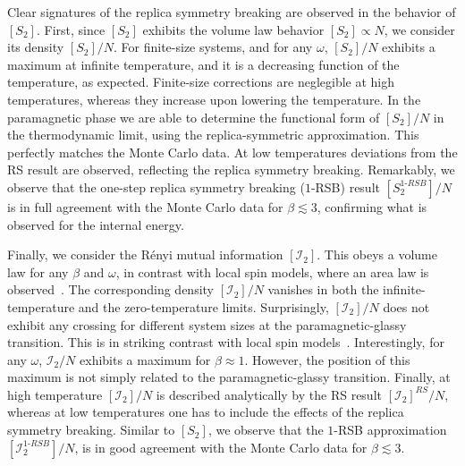 \documentclass[twocolumn,superscriptaddress,prb,10pt]{revtex4-1}
\begin{document}
Clear signatures of the replica symmetry breaking are observed in the behavior of $[S_2]$. 
First, since $[S_2]$ exhibits the volume law behavior $[S_2]\propto N$, 
we consider its density $[S_2]/N$. For finite-size systems, and for any $\omega$, $[S_2]/N$ 
exhibits a maximum at infinite temperature, and it is a decreasing function of the temperature, 
as expected. Finite-size corrections are neglegible at high temperatures, whereas they increase 
upon lowering the temperature. In the paramagnetic phase we are able to determine the functional 
form of $[S_2]/N$ in the thermodynamic limit, using the replica-symmetric approximation. This 
perfectly matches the Monte Carlo data. At low temperatures deviations from the RS result are 
observed, reflecting the replica symmetry breaking. Remarkably, we observe that the one-step 
replica symmetry breaking ($1$-RSB) result $[S_2^{1\textrm{-}RSB}]/N$ is in full agreement with 
the Monte Carlo data for $\beta\lesssim 3$, confirming what is observed for the internal 
energy. 

Finally, we consider the R\'enyi mutual information $[{\mathcal I}_2]$. This obeys a volume 
law for any $\beta$ and $\omega$, in contrast with local spin models, where an area law is 
observed~\cite{wolf-2008}. The corresponding density $[{\mathcal I}_2]/N$ vanishes in 
both the infinite-temperature and the zero-temperature limits. Surprisingly, $[{\mathcal I}_2]/N$ 
does not exhibit any crossing for different system sizes at the paramagnetic-glassy transition.
This is in striking contrast with local spin models~\cite{jaconis-2013}. Interestingly, for 
any $\omega$, ${\mathcal I}_2/N$ exhibits a maximum for $\beta\approx 1$. However, the 
position of this maximum is not simply related to the paramagnetic-glassy transition. Finally, 
at high temperature $[{\mathcal I}_2]/N$ is described analytically by the RS result 
$[{\mathcal I}_2]^{RS}/N$, whereas at low temperatures one has to include the effects of the 
replica symmetry breaking. Similar to $[S_2]$, we observe that the $1$-RSB approximation 
$[{\mathcal I}^{1\textrm{-}RSB}_2]/N$, is in good agreement with the Monte Carlo data 
for $\beta\lesssim 3$.
\end{document}
